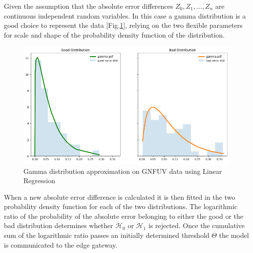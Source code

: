 \documentclass{mpaper}
\begin{document}
Given the assumption that the absolute error differences $Z_0, Z_1, \dotsc , Z_n $ are continuous independent random variables. In this case a gamma distribution is a good choice to represent the data  [Fig.\ref{fig:goodvsbad}], relying on the two flexible parameters for scale and shape of the probability density function of the distribution.

\begin{figure}[h]
    \centering
    \includegraphics[scale=0.3]{imgs/goodVSbad.png}
    \caption{Gamma distribution approximation on GNFUV data using Linear Regression}
    \label{fig:goodvsbad}
\end{figure}

When a new absolute error difference is calculated it is then fitted in the two probability density function for each of the two distributions. The logarithmic ratio of the probability of the absolute error belonging to either the good or the bad distribution determines whether $\mathcal{H}_0$ or $\mathcal{H}_1$ is rejected. Once the cumulative sum of the logarithmic ratio passes an initially determined threshold $\Theta$ the model is communicated to the edge gateway.
\end{document}
